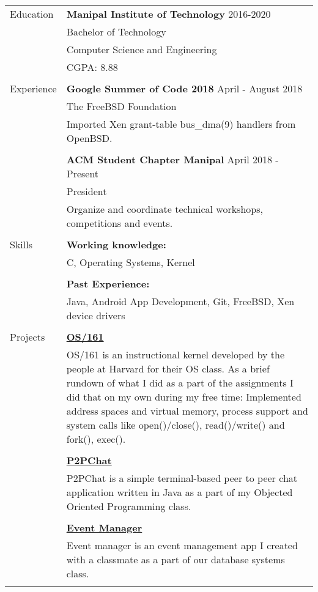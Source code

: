 \documentclass[letterpaper,11pt,oneside]{article}
\begin{document}
\noindent \begin{tabular}{@{} l l}
 \Large{Education} & \textbf{Manipal Institute of Technology} \hfill 2016-2020  \\
     & Bachelor of Technology \\
     & Computer Science and Engineering \\
     &  CGPA: 8.88\\
     & \\
 \Large{Experience}    & \textbf{Google Summer of Code 2018} \hfill April - August 2018 \\
    & The FreeBSD Foundation \\
    & Imported Xen grant-table bus\_dma(9) handlers from OpenBSD. \\
    & \\
    & \textbf{ACM Student Chapter Manipal} \hfill April 2018 -  Present \\
    & President \\
    & Organize and coordinate technical workshops, competitions and events. \\
    & \\
 \Large{Skills} & \textbf{Working knowledge:} \\
    & C, Operating Systems, Kernel \\
    & \\
    & \textbf{Past Experience:} \\
    & Java, Android App Development, Git, FreeBSD, Xen device drivers \\
    & \\
 \Large{Projects} & \textbf{\href{https://github.com/prati0100/OS161}{OS/161}} \vspace{1ex} \\
    & \parbox{5.0in}{OS/161 is an instructional kernel developed by the people at Harvard for their OS class. As a brief rundown of what I did as a part of the assignments I did that on my own during my free time: Implemented address spaces and virtual memory, process support and system calls like open()/close(), read()/write() and fork(), exec().} \\
    & \\
    & \textbf{\href{https://github.com/prati0100/P2PChat}{P2PChat}} \vspace{1ex} \\
    & \parbox{5.0in}{P2PChat is a simple terminal-based peer to peer chat application written in Java as a part of my Objected Oriented Programming class.} \\
    & \\
    & \textbf{\href{https://github.com/prati0100/EventManager}{Event Manager}} \vspace{1ex} \\
    & \parbox{5.0in}{Event manager is an event management app I created with a classmate as a part of our database systems class.} \\
    & \\

\end{tabular}
\end{document}

